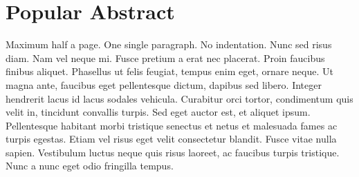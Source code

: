 \section*{Popular Abstract}

\noindent Maximum half a page. One single paragraph. No indentation. Nunc sed risus diam. Nam vel neque mi. Fusce pretium a erat nec placerat. Proin faucibus finibus aliquet. Phasellus ut felis feugiat, tempus enim eget, ornare neque. Ut magna ante, faucibus eget pellentesque dictum, dapibus sed libero. Integer hendrerit lacus id lacus sodales vehicula. Curabitur orci tortor, condimentum quis velit in, tincidunt convallis turpis. Sed eget auctor est, et aliquet ipsum. Pellentesque habitant morbi tristique senectus et netus et malesuada fames ac turpis egestas. Etiam vel risus eget velit consectetur blandit. Fusce vitae nulla sapien. Vestibulum luctus neque quis risus laoreet, ac faucibus turpis tristique. Nunc a nunc eget odio fringilla tempus.